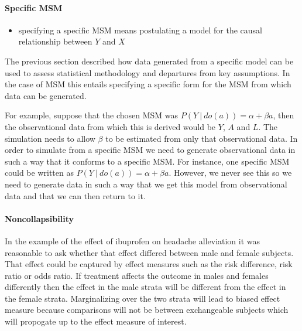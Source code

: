 \documentclass[11pt]{article}
\providecommand{\tightlist}{%
      \setlength{\itemsep}{0pt}\setlength{\parskip}{0pt}}
\begin{document}
    \paragraph{Specific MSM}\label{specific-msm}

\begin{itemize}
\tightlist
\item
  specifying a specific MSM means postulating a model for the causal
  relationship between \(Y\) and \(X\)
\end{itemize}

The previous section described how data generated from a specific model
can be used to assess statistical methodology and departures from key
assumptions. In the case of MSM this entails specifying a specific form
for the MSM from which data can be generated.

For example, suppose that the chosen MSM was
\(P(Y\ |\ do(a)) = \alpha + \beta a\), then the observational data from
which this is derived would be \(Y\), \(A\) and \(L\). The simulation
needs to allow \(\beta\) to be estimated from only that observational
data. In order to simulate from a specific MSM we need to generate
observational data in such a way that it conforms to a specific MSM. For
instance, one specific MSM could be written as
\(P(Y\ |\ do(a)) = \alpha + \beta a\). However, we never see this so we
need to generate data in such a way that we get this model from
observational data and that we can then return to it.

    \paragraph{Noncollapsibility}\label{noncollapsibility}

In the example of the effect of ibuprofen on headache alleviation it was
reasonable to ask whether that effect differed between male and female
subjects. That effect could be captured by effect measures such as the
risk difference, risk ratio or odds ratio. If treatment affects the
outcome in males and females differently then the effect in the male
strata will be different from the effect in the female strata.
Marginalizing over the two strata will lead to biased effect measure
because comparisons will not be between exchangeable subjects which will
propogate up to the effect measure of interest. \linebreak
\end{document}
